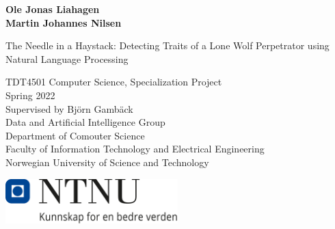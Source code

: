 \begin{titlepage}

\vbox{ }
\textbf{\Large Ole Jonas Liahagen\\Martin Johannes Nilsen\\}

\vspace{1cm}
\textcolor{airforceblue}{\Huge The Needle in a Haystack: Detecting Traits of a Lone Wolf Perpetrator using Natural Language Processing}

\vspace{2cm}
\large TDT4501 Computer Science, Specialization Project\\
\large Spring 2022\\
\large Supervised by Björn Gambäck\\

\vspace{1.2cm}
\large Data and Artificial Intelligence Group\\
\large Department of Comouter Science\\
\large Faculty of Information Technology and Electrical Engineering\\
\large Norwegian University of Science and Technology\\
\vfill

\includegraphics[width=0.50\textwidth]{Images/NTNU.png}\\[1cm]
\end{titlepage}